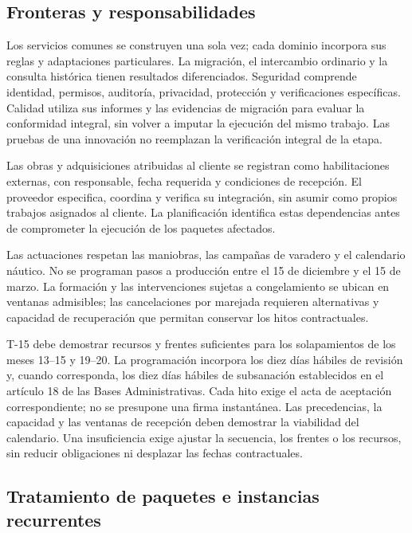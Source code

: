 \subsection{Fronteras y responsabilidades}

Los servicios comunes se construyen una sola vez; cada dominio incorpora sus reglas y adaptaciones particulares. La migración, el intercambio ordinario y la consulta histórica tienen resultados diferenciados. Seguridad comprende identidad, permisos, auditoría, privacidad, protección y verificaciones específicas. Calidad utiliza sus informes y las evidencias de migración para evaluar la conformidad integral, sin volver a imputar la ejecución del mismo trabajo. Las pruebas de una innovación no reemplazan la verificación integral de la etapa.

Las obras y adquisiciones atribuidas al cliente se registran como habilitaciones externas, con responsable, fecha requerida y condiciones de recepción. El proveedor especifica, coordina y verifica su integración, sin asumir como propios trabajos asignados al cliente. La planificación identifica estas dependencias antes de comprometer la ejecución de los paquetes afectados.

Las actuaciones respetan las maniobras, las campañas de varadero y el calendario náutico. No se programan pasos a producción entre el 15 de diciembre y el 15 de marzo. La formación y las intervenciones sujetas a congelamiento se ubican en ventanas admisibles; las cancelaciones por marejada requieren alternativas y capacidad de recuperación que permitan conservar los hitos contractuales.

T-15 debe demostrar recursos y frentes suficientes para los solapamientos de los meses 13--15 y 19--20. La programación incorpora los diez días hábiles de revisión y, cuando corresponda, los diez días hábiles de subsanación establecidos en el artículo 18 de las Bases Administrativas. Cada hito exige el acta de aceptación correspondiente; no se presupone una firma instantánea. Las precedencias, la capacidad y las ventanas de recepción deben demostrar la viabilidad del calendario. Una insuficiencia exige ajustar la secuencia, los frentes o los recursos, sin reducir obligaciones ni desplazar las fechas contractuales.

\subsection{Tratamiento de paquetes e instancias recurrentes}

